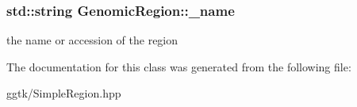 \subsubsection[{\texorpdfstring{\+\_\+name}{_name}}]{\setlength{\rightskip}{0pt plus 5cm}std\+::string Genomic\+Region\+::\+\_\+name}\hypertarget{classGenomicRegion_abb827ad33bd08fcf106229c60bc20106}{}\label{classGenomicRegion_abb827ad33bd08fcf106229c60bc20106}
the name or accession of the region 

The documentation for this class was generated from the following file\+:\begin{DoxyCompactItemize}
\item 
ggtk/Simple\+Region.\+hpp\end{DoxyCompactItemize}
